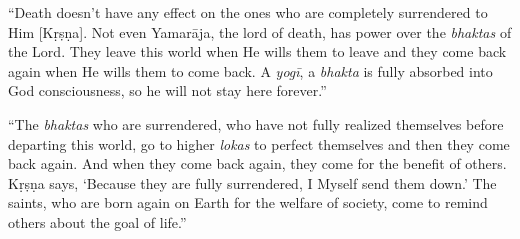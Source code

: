 \enquote{Death doesn’t have any effect on the ones who are completely surrendered to Him [Kṛṣṇa]. Not even Yamarāja, the lord of death, has power over the \textit{bhaktas} of the Lord. They leave this world when He wills them to leave and they come back again when He wills them to come back. A \textit{yogī}, a \textit{bhakta} is fully absorbed into God consciousness, so he will not stay here forever.}

\enquote{The \textit{bhaktas} who are surrendered, who have not fully realized themselves before departing this world, go to higher \textit{lokas} to perfect themselves and then they come back again. And when they come back again, they come for the benefit of others. Kṛṣṇa says, \enquote{Because they are fully surrendered, I Myself send them down.} The saints, who are born again on Earth for the welfare of society, come to remind others about the goal of life.}
